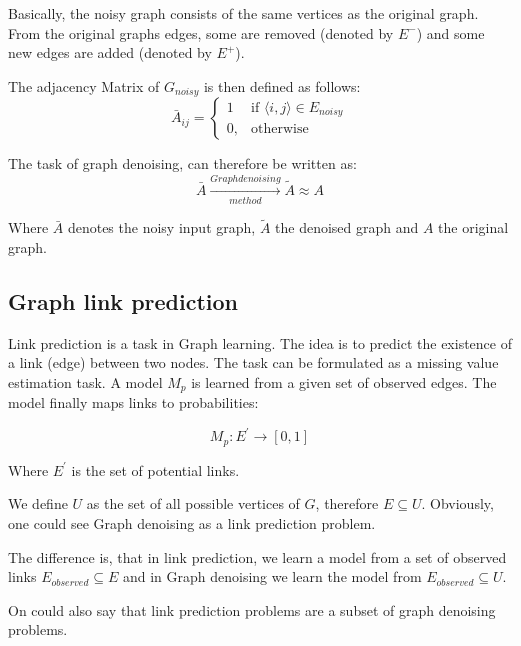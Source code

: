 Basically, the noisy graph consists of the same vertices as the original graph. From
the original graphs edges, some are removed (denoted by $E^{-}$) and some new edges are added
(denoted by $E^{+}$).

The adjacency Matrix of $G_{noisy}$ is then defined as follows:
\begin{equation}
    \bar{A}_{ij} =    
    \begin{cases}
        1  & \text{if } \langle i,j \rangle \in E_{noisy} \\
        0, & \text{otherwise}
    \end{cases}
\end{equation}

The task of graph denoising, can therefore be written as:
\begin{equation}
    \bar{A} \xrightarrow[method]{Graph denoising} \tilde{A} \approx A
\end{equation}

Where $\bar{A}$ denotes the noisy input graph, $\tilde{A}$ the denoised
 graph and $A$ the original graph.


\subsection{Graph link prediction}
Link prediction is a task in Graph learning. 
The idea is to predict the existence of a link (edge) between two nodes.
The task can be formulated as a missing value estimation task. A model $M_p$ is learned
from a given set of observed edges. The model finally maps links to probabilities:


\begin{equation}
    M_p : E^{\prime} \rightarrow [0,1]
\end{equation}

Where $E^{\prime}$ is the set of potential links.


We define $U$ as the set of all possible vertices of $G$, therefore $E \subseteq U$.
Obviously, one could see Graph denoising as a link prediction problem.

The difference is, that in link prediction, we learn a model from a set of observed links 
$E_{observed} \subseteq E$ and in Graph denoising we learn the model from 
$E_{observed} \subseteq U$. 

On could also say that link prediction problems are a subset of graph denoising problems.


